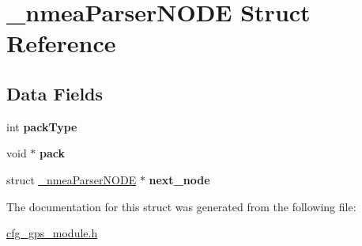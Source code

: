 \hypertarget{struct__nmea_parser_n_o_d_e}{}\section{\+\_\+nmea\+Parser\+N\+O\+DE Struct Reference}
\label{struct__nmea_parser_n_o_d_e}
\subsection*{Data Fields}
\begin{DoxyCompactItemize}
\item 
\mbox{\label{struct__nmea_parser_n_o_d_e_a359fbf92992fa2e5fe337f877d16ba58}} 
int {\bfseries pack\+Type}
\item 
\mbox{\label{struct__nmea_parser_n_o_d_e_adf18b50dac454e0ee95b0a909b3ad0f1}} 
void $\ast$ {\bfseries pack}
\item 
\mbox{\label{struct__nmea_parser_n_o_d_e_a5504f02051704b869cbbdc4dd4cdb260}} 
struct \hyperlink{struct__nmea_parser_n_o_d_e}{\+\_\+nmea\+Parser\+N\+O\+DE} $\ast$ {\bfseries next\+\_\+node}
\end{DoxyCompactItemize}


The documentation for this struct was generated from the following file\+:\begin{DoxyCompactItemize}
\item 
\hyperlink{cfg__gps__module_8h}{cfg\+\_\+gps\+\_\+module.\+h}\end{DoxyCompactItemize}
